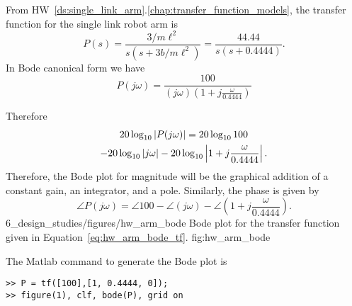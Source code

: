 From HW~\ref{ds:single_link_arm}.\ref{chap:transfer_function_models}, the transfer function for the single link robot arm is 
\begin{equation}\label{eq:hw_arm_bode_tf}
P(s) = \frac{3/m\ell^2}{s(s+3b/m\ell^2)} = \frac{44.44}{s(s+0.4444)}.
\end{equation}
In Bode canonical form we have
\[
P(j\omega) = \frac{100}{(j\omega)(1+j\frac{\omega}{0.4444})}
\]

Therefore
\begin{multline}\label{eq:loop_bode_example2}
20\log_{10}\left|P(j\omega)\right|= 
	20\log_{10} 100 \\
	-20\log_{10}\left|j\omega\right|
	-20\log_{10}\left|1+j\frac{\omega}{0.4444}\right|.
\end{multline}
Therefore, the Bode plot for magnitude will be the graphical addition of a constant gain, an integrator, and a pole.
Similarly, the phase is given by
\[
\angle P(j\omega) = 
	\angle 100 
	- \angle (j\omega)
	- \angle (1+j\frac{\omega}{0.4444}).
\]
	{6_design_studies/figures/hw_arm_bode}
	{Bode plot for the transfer function given in Equation~\eqref{eq:hw_arm_bode_tf}.}
	{fig:hw_arm_bode}

The Matlab command to generate the Bode plot is
\begin{lstlisting}
>> P = tf([100],[1, 0.4444, 0]);
>> figure(1), clf, bode(P), grid on
\end{lstlisting}
